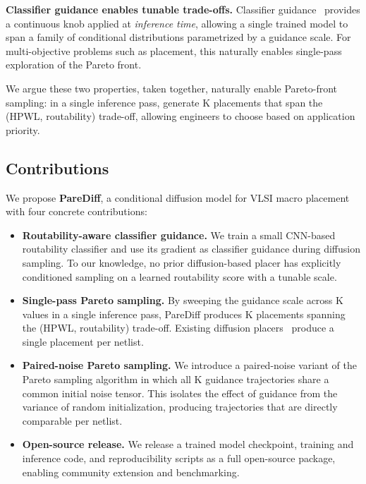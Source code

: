 \documentclass[lettersize,journal]{IEEEtran}
\begin{document}
\textbf{Classifier guidance enables tunable trade-offs.} Classifier guidance~\cite{dhariwal2021guidance} provides a continuous knob applied at \emph{inference time}, allowing a single trained model to span a family of conditional distributions parametrized by a guidance scale. For multi-objective problems such as placement, this naturally enables single-pass exploration of the Pareto front.

We argue these two properties, taken together, naturally enable Pareto-front sampling: in a single inference pass, generate K placements that span the (HPWL, routability) trade-off, allowing engineers to choose based on application priority.

\subsection{Contributions}

We propose \textbf{PareDiff}, a conditional diffusion model for VLSI macro placement with four concrete contributions:

\begin{itemize}
\item \textbf{Routability-aware classifier guidance.} We train a small CNN-based routability classifier and use its gradient as classifier guidance during diffusion sampling. To our knowledge, no prior diffusion-based placer has explicitly conditioned sampling on a learned routability score with a tunable scale.

\item \textbf{Single-pass Pareto sampling.} By sweeping the guidance scale across K values in a single inference pass, PareDiff produces K placements spanning the (HPWL, routability) trade-off. Existing diffusion placers~\cite{lee2024chipdiffusion, trung2025diffplace, fang2025graphdiffusion} produce a single placement per netlist.

\item \textbf{Paired-noise Pareto sampling.} We introduce a paired-noise variant of the Pareto sampling algorithm in which all K guidance trajectories share a common initial noise tensor. This isolates the effect of guidance from the variance of random initialization, producing trajectories that are directly comparable per netlist.

\item \textbf{Open-source release.} We release a trained model checkpoint, training and inference code, and reproducibility scripts as a full open-source package, enabling community extension and benchmarking.
\end{itemize}
\end{document}
